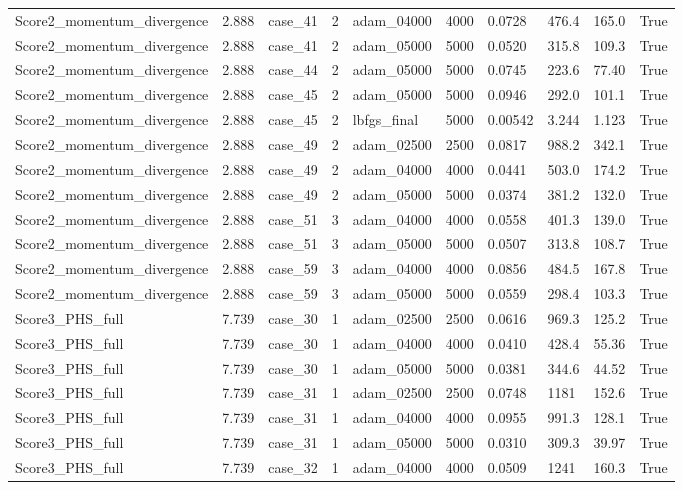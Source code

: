 \begin{longtable}{llllllllll}
Score2\_momentum\_divergence & 2.888 & case\_41 & 2 & adam\_04000 & 4000 & 0.0728 & 476.4 & 165.0 & True \\
Score2\_momentum\_divergence & 2.888 & case\_41 & 2 & adam\_05000 & 5000 & 0.0520 & 315.8 & 109.3 & True \\
Score2\_momentum\_divergence & 2.888 & case\_44 & 2 & adam\_05000 & 5000 & 0.0745 & 223.6 & 77.40 & True \\
Score2\_momentum\_divergence & 2.888 & case\_45 & 2 & adam\_05000 & 5000 & 0.0946 & 292.0 & 101.1 & True \\
Score2\_momentum\_divergence & 2.888 & case\_45 & 2 & lbfgs\_final & 5000 & 0.00542 & 3.244 & 1.123 & True \\
Score2\_momentum\_divergence & 2.888 & case\_49 & 2 & adam\_02500 & 2500 & 0.0817 & 988.2 & 342.1 & True \\
Score2\_momentum\_divergence & 2.888 & case\_49 & 2 & adam\_04000 & 4000 & 0.0441 & 503.0 & 174.2 & True \\
Score2\_momentum\_divergence & 2.888 & case\_49 & 2 & adam\_05000 & 5000 & 0.0374 & 381.2 & 132.0 & True \\
Score2\_momentum\_divergence & 2.888 & case\_51 & 3 & adam\_04000 & 4000 & 0.0558 & 401.3 & 139.0 & True \\
Score2\_momentum\_divergence & 2.888 & case\_51 & 3 & adam\_05000 & 5000 & 0.0507 & 313.8 & 108.7 & True \\
Score2\_momentum\_divergence & 2.888 & case\_59 & 3 & adam\_04000 & 4000 & 0.0856 & 484.5 & 167.8 & True \\
Score2\_momentum\_divergence & 2.888 & case\_59 & 3 & adam\_05000 & 5000 & 0.0559 & 298.4 & 103.3 & True \\
Score3\_PHS\_full & 7.739 & case\_30 & 1 & adam\_02500 & 2500 & 0.0616 & 969.3 & 125.2 & True \\
Score3\_PHS\_full & 7.739 & case\_30 & 1 & adam\_04000 & 4000 & 0.0410 & 428.4 & 55.36 & True \\
Score3\_PHS\_full & 7.739 & case\_30 & 1 & adam\_05000 & 5000 & 0.0381 & 344.6 & 44.52 & True \\
Score3\_PHS\_full & 7.739 & case\_31 & 1 & adam\_02500 & 2500 & 0.0748 & 1181 & 152.6 & True \\
Score3\_PHS\_full & 7.739 & case\_31 & 1 & adam\_04000 & 4000 & 0.0955 & 991.3 & 128.1 & True \\
Score3\_PHS\_full & 7.739 & case\_31 & 1 & adam\_05000 & 5000 & 0.0310 & 309.3 & 39.97 & True \\
Score3\_PHS\_full & 7.739 & case\_32 & 1 & adam\_04000 & 4000 & 0.0509 & 1241 & 160.3 & True \\

\end{longtable}
